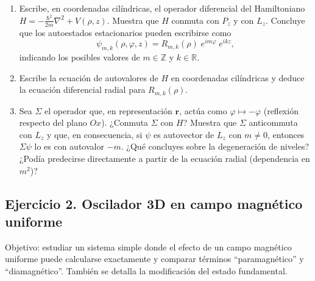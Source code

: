 \documentclass[a4paper,11pt]{article}
\begin{document}
\begin{enumerate}
	\item Escribe, en coordenadas cilíndricas, el operador diferencial del Hamiltoniano $H= -\tfrac{\hbar^2}{2m}\nabla^2+V(\rho,z)$. Muestra que $H$ conmuta con $P_z$ y con $L_z$. Concluye que los autoestados estacionarios pueden escribirse como
	\[
	\psi_{m,k}(\rho,\varphi,z)= R_{m,k}(\rho)\;e^{i m\varphi}\;e^{i k z},
	\]
	indicando los posibles valores de $m\in\mathbb{Z}$ y $k\in\mathbb{R}$.
	\item Escribe la ecuación de autovalores de $H$ en coordenadas cilíndricas y deduce la ecuación diferencial radial para $R_{m,k}(\rho)$.
	\item Sea $\Sigma$ el operador que, en representación $\mathbf{r}$, actúa como $\varphi\mapsto-\varphi$ (reflexión respecto del plano $Ox$). ¿Conmuta $\Sigma$ con $H$? Muestra que $\Sigma$ anticommuta con $L_z$ y que, en consecuencia, si $\psi$ es autovector de $L_z$ con $m\ne0$, entonces $\Sigma\psi$ lo es con autovalor $-m$. ¿Qué concluyes sobre la degeneración de niveles? ¿Podía predecirse directamente a partir de la ecuación radial (dependencia en $m^2$)?
\end{enumerate}

\subsection*{Ejercicio 2. Oscilador 3D en campo magnético uniforme}
Objetivo: estudiar un sistema simple donde el efecto de un campo magnético uniforme puede calcularse exactamente y comparar términos “paramagnético” y “diamagnético”. También se detalla la modificación del estado fundamental.
\end{document}
